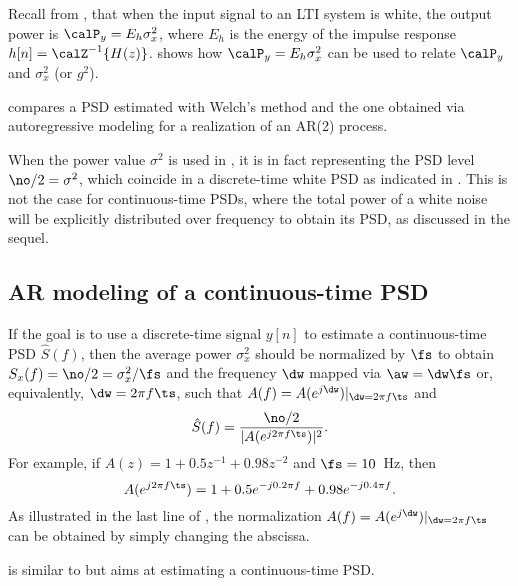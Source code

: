 Recall from , that when the input signal to an LTI system is white, the output power is $\calP_y = E_h \sigma_x^2$, where $E_h$ is the energy of the impulse response $h[n]=\calZ^{-1} \{H(z)\}$.
 shows how $\calP_y = E_h \sigma_x^2$ can be used to relate $\calP_y$ and $\sigma_x^2$ (or $g^2$).


 compares a PSD estimated with Welch's method and the one obtained via autoregressive modeling for a realization of an AR(2) process.


When the power value $\sigma^2$ is used in , it is in fact representing the PSD level $\no/2 = \sigma^2$, which coincide in a discrete-time white PSD as indicated in . 
This is not the case for continuous-time PSDs, where the total power of a white noise will be explicitly distributed over frequency to obtain its PSD, as discussed in the sequel.

\subsection{AR modeling of a continuous-time PSD}

If the goal is to use a discrete-time signal $y[n]$ to estimate a continuous-time PSD $\hat S(f)$, then the average power $\sigma_x^2$ should be normalized by $\fs$ to obtain $S_x(f)=\no/2 = \sigma_x^2 / \fs$ and the frequency $\dw$ mapped via $\aw=\dw \fs$ or, equivalently,
$\dw=2 \pi f \ts$, such that $A(f) = A(e^{j \dw})|_{\dw=2 \pi f \ts}$ and
\begin{equation}
\hat S(f) = \frac {\no/2} {|A(e^{j 2 \pi f \ts})|^2}.
\label{eq:ar_psd_continuousHz}
\end{equation}
For example, if $A(z)=1+0.5z^{-1}+0.98z^{-2}$ and $\fs=10$~Hz, then 
\[
A(e^{j 2 \pi f \ts}) = 1+0.5e^{-j 0.2 \pi f}+0.98e^{-j 0.4 \pi f}.
\]
As illustrated in the last line of , the normalization $A(f) = A(e^{j \dw})|_{\dw=2 \pi f \ts}$ can be obtained by simply changing the abscissa.

 is similar to  but aims at estimating a continuous-time PSD.

